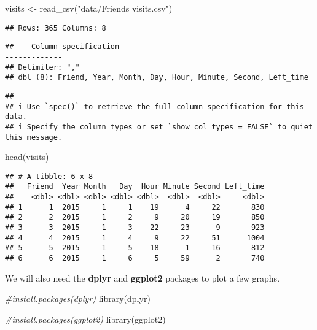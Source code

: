 \documentclass[
]{book}
\newenvironment{Shaded}{\begin{snugshade}}{\end{snugshade}}
\newcommand{\CommentTok}[1]{\textcolor[rgb]{0.56,0.35,0.01}{\textit{#1}}}
\newcommand{\FunctionTok}[1]{\textcolor[rgb]{0.00,0.00,0.00}{#1}}
\newcommand{\NormalTok}[1]{#1}
\newcommand{\OtherTok}[1]{\textcolor[rgb]{0.56,0.35,0.01}{#1}}
\newcommand{\StringTok}[1]{\textcolor[rgb]{0.31,0.60,0.02}{#1}}
\begin{document}
\begin{Shaded}
\begin{Highlighting}[]
\NormalTok{visits }\OtherTok{\textless{}{-}} \FunctionTok{read\_csv}\NormalTok{(}\StringTok{"data/Friends visits.csv"}\NormalTok{)}
\end{Highlighting}
\end{Shaded}

\begin{verbatim}
## Rows: 365 Columns: 8
\end{verbatim}

\begin{verbatim}
## -- Column specification --------------------------------------------------------
## Delimiter: ","
## dbl (8): Friend, Year, Month, Day, Hour, Minute, Second, Left_time
\end{verbatim}

\begin{verbatim}
## 
## i Use `spec()` to retrieve the full column specification for this data.
## i Specify the column types or set `show_col_types = FALSE` to quiet this message.
\end{verbatim}

\begin{Shaded}
\begin{Highlighting}[]
\FunctionTok{head}\NormalTok{(visits)}
\end{Highlighting}
\end{Shaded}

\begin{verbatim}
## # A tibble: 6 x 8
##   Friend  Year Month   Day  Hour Minute Second Left_time
##    <dbl> <dbl> <dbl> <dbl> <dbl>  <dbl>  <dbl>     <dbl>
## 1      1  2015     1     1    19      4     22       830
## 2      2  2015     1     2     9     20     19       850
## 3      3  2015     1     3    22     23      9       923
## 4      4  2015     1     4     9     22     51      1004
## 5      5  2015     1     5    18      1     16       812
## 6      6  2015     1     6     5     59      2       740
\end{verbatim}

We will also need the \textbf{dplyr} and \textbf{ggplot2} packages to plot a few graphs.

\begin{Shaded}
\begin{Highlighting}[]
\CommentTok{\#install.packages(dplyr)}
\FunctionTok{library}\NormalTok{(dplyr)}

\CommentTok{\#install.packages(ggplot2)}
\FunctionTok{library}\NormalTok{(ggplot2)}
\end{Highlighting}
\end{Shaded}
\end{document}
